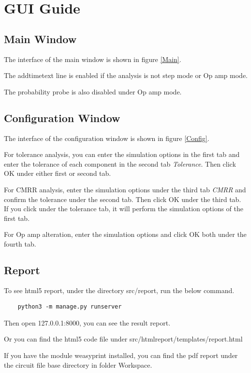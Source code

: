 \documentclass[12pt,a4paper]{article}
\begin{document}
\section{GUI Guide}
\subsection{Main Window}
The interface of the main window is shown in figure \ref{Main}.

The addtimetext line is enabled if the analysis is not step mode or Op amp mode.

The probability probe is also disabled under Op amp mode.

\subsection{Configuration Window}
The interface of the configuration window is shown in figure \ref{Config}.

For tolerance analysis, you can enter the simulation options in the first tab and enter the tolerance of each component in the second tab \textit{Tolerance}. Then click OK under either first or second tab.

For CMRR analysis, enter the simulation options under the third tab \textit{CMRR} and confirm the tolerance under the second tab. Then click OK under the third tab. If you click under the tolerance tab, it will perform the simulation options of the first tab.

For Op amp alteration, enter the simulation options and click OK both under the fourth tab.

\subsection{Report}
To see html5 report, under the directory src/report, run the below command.
\begin{lstlisting}
    python3 -m manage.py runserver
\end{lstlisting}

Then open 127.0.0.1:8000, you can see the result report.

Or you can find the html5 code file under src/htmlreport/templates/report.html

If you have the module weasyprint installed, you can find the pdf report under the circuit file base directory in folder Workspace.



%
\end{document}
